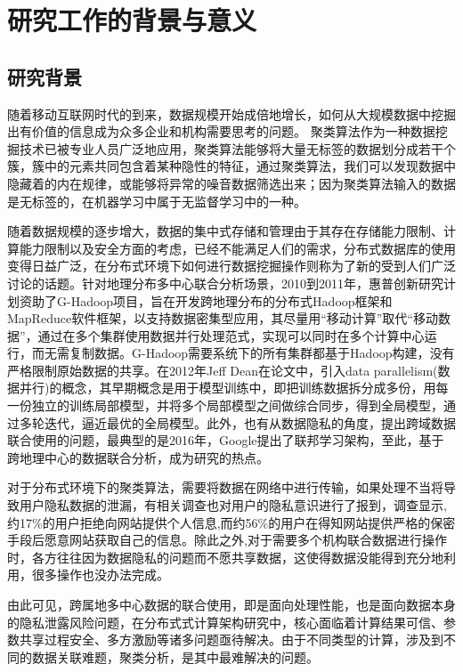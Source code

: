 \thesischapterexordium

\section{研究工作的背景与意义}

\subsection{研究背景}

随着移动互联网时代的到来，数据规模开始成倍地增长，如何从大规模数据中挖掘出有价值的信息成为众多企业和机构需要思考的问题。
聚类算法作为一种数据挖掘技术已被专业人员广泛地应用，聚类算法能够将大量无标签的数据划分成若干个簇，簇中的元素共同包含着某种隐性的特征，通过聚类算法，我们可以发现数据中隐藏着的内在规律，或能够将异常的噪音数据筛选出来；因为聚类算法输入的数据是无标签的，在机器学习中属于无监督学习中的一种。

随着数据规模的逐步增大，数据的集中式存储和管理由于其存在存储能力限制、计算能力限制以及安全方面的考虑，已经不能满足人们的需求，分布式数据库的使用变得日益广泛，在分布式环境下如何进行数据挖掘操作则称为了新的受到人们广泛讨论的话题。针对地理分布多中心联合分析场景，2010到2011年，惠普创新研究计划资助了G-Hadoop项目，旨在开发跨地理分布的分布式Hadoop框架和MapReduce软件框架，以支持数据密集型应用，其尽量用“移动计算”取代“移动数据”，通过在多个集群使用数据并行处理范式，实现可以同时在多个计算中心运行，而无需复制数据。G-Hadoop需要系统下的所有集群都基于Hadoop构建，没有严格限制原始数据的共享。在2012年Jeff Dean在论文\cite{dean2012large}中，引入data parallelism(数据并行)的概念，其早期概念是用于模型训练中，即把训练数据拆分成多份，用每一份独立的训练局部模型，并将多个局部模型之间做综合同步，得到全局模型，通过多轮迭代，逼近最优的全局模型。此外，也有从数据隐私的角度，提出跨域数据联合使用的问题，最典型的是2016年，Google提出了联邦学习架构，至此，基于跨地理中心的数据联合分析，成为研究的热点。

对于分布式环境下的聚类算法，需要将数据在网络中进行传输，如果处理不当将导致用户隐私数据的泄漏，有相关调查也对用户的隐私意识进行了报到，调查显示,约17\%的用户拒绝向网站提供个人信息,而约56\%的用户在得知网站提供严格的保密手段后愿意网站获取自己的信息。除此之外,对于需要多个机构联合数据进行操作时，各方往往因为数据隐私的问题而不愿共享数据，这使得数据没能得到充分地利用，很多操作也没办法完成。


由此可见，跨属地多中心数据的联合使用，即是面向处理性能，也是面向数据本身的隐私泄露风险问题，在分布式式计算架构研究中，核心面临着计算结果可信、参数共享过程安全、多方激励等诸多问题亟待解决。由于不同类型的计算，涉及到不同的数据关联难题，聚类分析，是其中最难解决的问题。


